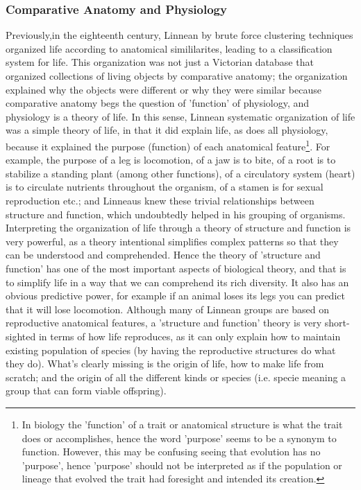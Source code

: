 \subsubsection{Comparative Anatomy and Physiology}
Previously,in the eighteenth century, Linnean by brute force clustering techniques organized life according to anatomical simililarites, leading to a classification system for life. This organization was not just a Victorian database that organized collections of living objects by comparative anatomy; the organization explained why the objects were different or why they were similar because comparative anatomy begs the question of 'function' of physiology, and physiology is a theory of life.   In this sense, Linnean systematic organization of life was a simple theory of life, in that it did explain life, as does all physiology, because it explained the purpose (function) of each anatomical feature\footnote{In biology the 'function' of a trait or anatomical structure is what the trait does or accomplishes, hence the word 'purpose' seems to be a synonym to function.  However, this may be confusing seeing that evolution has no 'purpose', hence 'purpose' should not be interpreted as if the population or lineage that evolved the trait had foresight and intended its creation.}.  For example, the purpose of a leg is locomotion, of a jaw is to bite, of a root is to stabilize a standing plant (among other functions), of a circulatory system (heart) is to circulate nutrients throughout the organism, of a stamen is for sexual reproduction etc.; and Linneaus knew these trivial relationships between structure and function, which undoubtedly helped in his grouping of organisms.  Interpreting the organization of life through a theory of structure and function is very powerful, as a theory intentional simplifies complex patterns so that they can be understood and comprehended.  Hence the theory of 'structure and function' has one of the most important aspects of biological theory, and that is to simplify life in a way that we can comprehend its rich diversity.  It also has an obvious predictive power, for example if an animal loses its legs you can predict that it will lose locomotion.  Although many of Linnean groups are based on reproductive anatomical features, a 'structure and function' theory is very short-sighted in terms of how life reproduces, as it can only explain how to maintain existing population of species (by having the reproductive structures do what they do).  What's clearly missing is the origin of life, how to make life from scratch; and the origin of all the different kinds or species (i.e. specie meaning a group that can form viable offspring).

